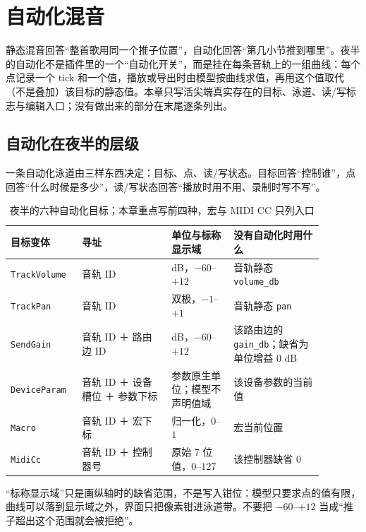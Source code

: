 \chapter{自动化混音}
\label{chap:automation}


静态混音回答“整首歌用同一个推子位置”，自动化回答“第几小节推到哪里”。夜半的自动化不是插件里的一个“自动化开关”，而是挂在每条音轨上的一组曲线：每个点记录一个 tick 和一个值，播放或导出时由模型按曲线求值，再用这个值取代（不是叠加）该目标的静态值。本章只写活尖端真实存在的目标、泳道、读/写标志与编辑入口；没有做出来的部分在末尾逐条列出。

\section{自动化在夜半的层级}

一条自动化泳道由三样东西决定：目标、点、读/写状态。目标回答“控制谁”，点回答“什么时候是多少”，读/写状态回答“播放时用不用、录制时写不写”。

\begin{table}[htbp]
\centering
\small
\begin{tabular}{@{}p{0.18\linewidth}p{0.26\linewidth}p{0.18\linewidth}p{0.26\linewidth}@{}}
\hline
目标变体 & 寻址 & 单位与标称显示域 & 没有自动化时用什么 \\
\hline
\texttt{TrackVolume} & 音轨 ID & dB，$-60$–$+12$ & 音轨静态 \texttt{volume\_db} \\
\texttt{TrackPan} & 音轨 ID & 双极，$-1$–$+1$ & 音轨静态 \texttt{pan} \\
\texttt{SendGain} & 音轨 ID ＋ 路由边 ID & dB，$-60$–$+12$ & 该路由边的 \texttt{gain\_db}；缺省为单位增益 0 dB \\
\texttt{DeviceParam} & 音轨 ID ＋ 设备槽位 ＋ 参数下标 & 参数原生单位；模型不声明值域 & 该设备参数的当前值 \\
\texttt{Macro} & 音轨 ID ＋ 宏下标 & 归一化，$0$–$1$ & 宏当前位置 \\
\texttt{MidiCc} & 音轨 ID ＋ 控制器号 & 原始 7 位值，$0$–$127$ & 该控制器缺省 0 \\
\hline
\end{tabular}
\caption{夜半的六种自动化目标；本章重点写前四种，宏与 MIDI CC 只列入口}
\label{tab:automation-targets}
\end{table}

“标称显示域”只是画纵轴时的缺省范围，不是写入钳位：模型只要求点的值有限，曲线可以落到显示域之外，界面只把像素钳进泳道带。不要把 $-60$–$+12$ 当成“推子超出这个范围就会被拒绝”。

